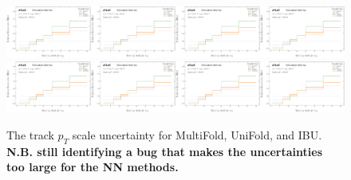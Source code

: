 \begin{figure}[h!]
\includegraphics[width=0.25\textwidth,page=68]{figures/SimResults/TrackJet_SystEffect.pdf}\includegraphics[width=0.25\textwidth,page=72]{figures/SimResults/TrackJet_SystEffect.pdf}\includegraphics[width=0.25\textwidth,page=76]{figures/SimResults/TrackJet_SystEffect.pdf}\includegraphics[width=0.25\textwidth,page=80]{figures/SimResults/TrackJet_SystEffect.pdf}\\
\includegraphics[width=0.25\textwidth,page=84]{figures/SimResults/TrackJet_SystEffect.pdf}\includegraphics[width=0.25\textwidth,page=88]{figures/SimResults/TrackJet_SystEffect.pdf}\includegraphics[width=0.25\textwidth,page=92]{figures/SimResults/TrackJet_SystEffect.pdf}\includegraphics[width=0.25\textwidth,page=96]{figures/SimResults/TrackJet_SystEffect.pdf}
\caption{The track $p_T$ scale uncertainty for MultiFold, UniFold, and IBU.  \textbf{N.B. still identifying a bug that makes the uncertainties too large for the NN methods.}}
\label{fig:simresultsmulti_trackjetuncertsl4a}
\end{figure}

